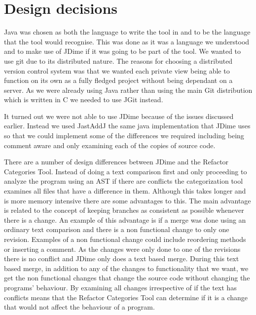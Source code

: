 
\section{Design decisions}
Java was chosen as both the language to write the tool in and to be the language that the tool would recognise.  This was done as it was a language we understood and to make use of JDime if it was going to be part of the tool.  We wanted to use git due to its distributed nature.  The reasons for choosing a distributed version control system was that we wanted each private view being able to function on its own as a fully fledged project without being dependant on a server.  As we were already using Java rather than using the main Git distribution which is written in C we needed to use JGit instead.    

It turned out we were not able to use JDime because of the issues discussed earlier. Instead we used JastAddJ the same java implementation that JDime uses so that we could implement some of the differences we required including being comment aware and only examining each of the copies of source code.

There are a number of design differences between JDime and the Refactor Categories Tool.  Instead of doing a text comparison first and only proceeding to analyze the program using an AST if there are conflicts the categorization tool examines all files that have a difference in them.  Although this takes longer and is more memory intensive there are some advantages to this. The main advantage is related to the concept of keeping branches as consistent as possible whenever there is a change. An example of this advantage is if a merge was done using an ordinary text comparison and there is a non functional change to only one revision. Examples of a non functional change could include reordering methods or inserting a comment.  As the changes were only done to one of the revisions there is no conflict and JDime only does a text based merge.  During this text based merge, in addition to any of the changes to functionality that we want, we get the non functional changes that change the source code without changing the programs' behaviour. By examining all changes irrespective of if the text has conflicts means that the Refactor Categories Tool can determine if it is a change that would not affect the behaviour of a program.

